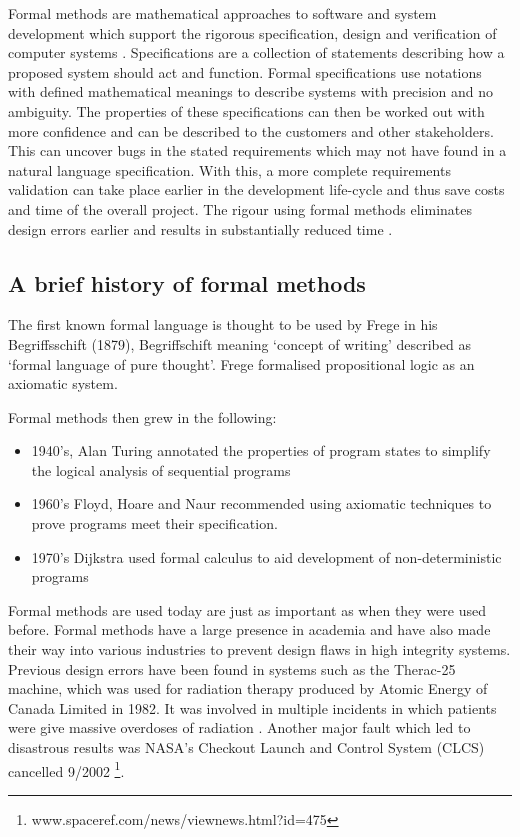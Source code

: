 Formal methods are mathematical approaches to software and system development which support the rigorous specification, design and verification of computer systems \cite{fmeurope}. Specifications are a collection of statements describing how a proposed system should act and function. Formal specifications use notations with defined mathematical meanings to describe systems with precision and no ambiguity. The properties of these specifications can then be worked out with more confidence and can be described to the customers and other stakeholders. This can uncover bugs in the stated requirements which may not have found in a natural language specification. With this, a more complete requirements validation can take place earlier in the development life-cycle and thus save costs and time of the overall project. The rigour using formal methods eliminates design errors earlier and results in substantially reduced time \cite{benefitsofform}. 

\subsection{A brief history of formal methods}

The first known formal language is thought to be used by Frege in his Begriffsschift (1879), Begriffschift meaning `concept of writing' described as `formal language of pure thought'. Frege formalised propositional logic as an axiomatic system.

Formal methods then grew in the following:

\begin{itemize}
\item 1940's, Alan Turing annotated the properties of program states to simplify the logical analysis of sequential programs

\item 1960's Floyd, Hoare and Naur recommended using axiomatic techniques to prove programs meet their specification.

\item 1970's Dijkstra used formal calculus to aid development of non-deterministic programs
\end{itemize}

Formal methods are used today are just as important as when they were used before. Formal methods have a large presence in academia and have also made their way into various industries to prevent design flaws in high integrity systems. Previous design errors have been found in systems such as the Therac-25 machine, which was used for radiation therapy produced by Atomic Energy of Canada Limited in 1982. It was involved in multiple incidents in which patients were give massive overdoses of radiation \cite{baase2003gift}. Another major fault which led to disastrous results was NASA’s Checkout Launch and Control System (CLCS) cancelled 9/2002 \footnote{www.spaceref.com/news/viewnews.html?id=475}.

